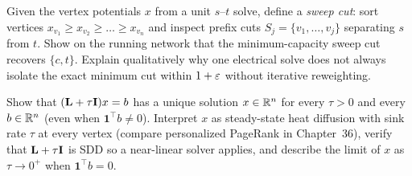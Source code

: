 \begin{exercise}
Given the vertex potentials $x$ from a unit $s$--$t$ solve, define a \emph{sweep cut}: sort vertices $x_{v_1} \ge x_{v_2} \ge \dots \ge x_{v_n}$ and inspect prefix cuts $S_j = \{v_1,\dots,v_j\}$ separating $s$ from $t$. Show on the running network that the minimum-capacity sweep cut recovers $\{c,t\}$. Explain qualitatively why one electrical solve does not always isolate the exact minimum cut within $1+\varepsilon$ without iterative reweighting.
\end{exercise}

\begin{exercise}
Show that $(\mathbf{L}+\tau\mathbf{I})x=b$ has a unique solution $x \in \mathbb{R}^n$ for every $\tau>0$ and every $b \in \mathbb{R}^n$ (even when $\mathbf{1}^\top b \ne 0$). Interpret $x$ as steady-state heat diffusion with sink rate $\tau$ at every vertex (compare personalized PageRank in Chapter~36), verify that $\mathbf{L}+\tau\mathbf{I}$ is SDD so a near-linear solver applies, and describe the limit of $x$ as $\tau \to 0^+$ when $\mathbf{1}^\top b = 0$.
\end{exercise}
